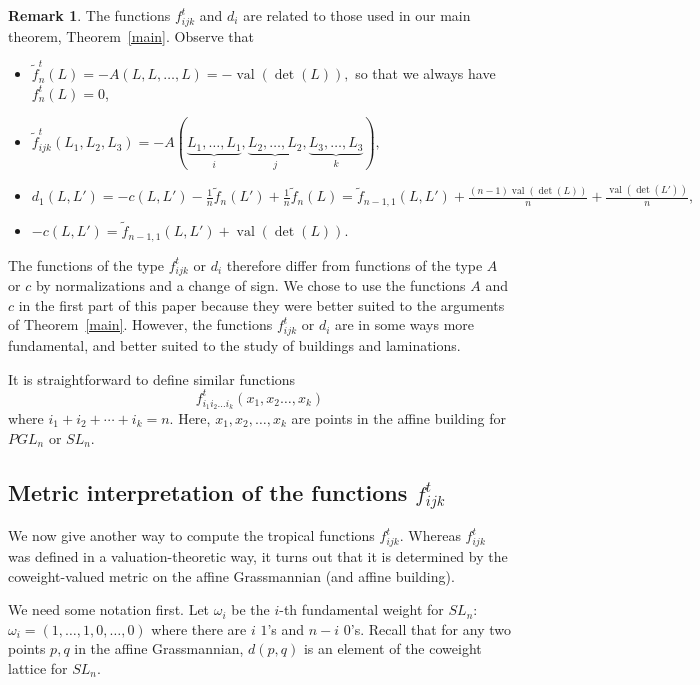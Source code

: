 \documentclass[10pt]{amsart}
\theoremstyle{definition}
\newtheorem{rema}[theorem]{Remark}
\newcommand{\val}{\operatorname{val}}
\begin{document}
\begin{rema} \label{normalization} The functions $f_{ijk}^t$ and $d_i$ are related to those used in our main theorem, Theorem~\ref{main}. Observe that

\begin{itemize}
\item $\tilde{f}^t_n(L)= -A(L, L, \dots, L) = -\val(\det(L)),$ so that we always have $f^t_n(L)=0$,
\item $\tilde{f}_{ijk}^t (L_1,L_2,L_3) = -A(\underbrace{L_1,\ldots,L_1}_{i}, \underbrace{L_2,\ldots,L_2}_{j}, \underbrace{L_3,\ldots,L_3}_{k}),$
\item $d_1(L, L') = -c(L, L') - \frac{1}{n} \tilde{f}_n(L') + \frac{1}{n} \tilde{f}_n(L) = \tilde{f}_{n-1,1}(L,L') + \frac{(n-1)\val(\det(L))}{n} + \frac{\val(\det(L'))}{n},$ 
\item $-c(L, L') = \tilde{f}_{n-1,1}(L,L') + \val(\det(L)).$
\end{itemize}

The functions of the type $f_{ijk}^t$ or $d_i$ therefore differ from functions of the type $A$ or $c$ by normalizations and a change of sign. We chose to use the functions $A$ and $c$ in the first part of this paper because they were better suited to the arguments of Theorem~\ref{main}. However, the functions $f_{ijk}^t$ or $d_i$ are in some ways more fundamental, and better suited to the study of buildings and laminations.

\end{rema}

It is straightforward to define similar functions 
\[
f_{i_1i_2\dots i_k}^t(x_1,x_2\dots,x_k) %
\]
where $i_1+i_2+\cdots+i_k=n$. Here, $x_1, x_2, \dots, x_k$ are points in the affine building for $PGL_n$ or $SL_n$.

\subsection{Metric interpretation of the functions \texorpdfstring{$f^t_{ijk}$}{f ijk t}}

We now give another way to compute the tropical functions $f_{ijk}^t$. Whereas $f_{ijk}^t$ was defined in a valuation-theoretic way, it turns out that it is determined by the coweight-valued metric on the affine Grassmannian (and affine building).

We need some notation first. Let $\omega_i$ be the $i$-th fundamental weight for $SL_n$: $\omega_i = (1, \dots, 1, 0, \dots, 0)$ where there are $i$ $1$'s and $n-i$ $0$'s. Recall that for any two points $p, q$ in the affine Grassmannian, $d(p,q)$ is an element of the coweight lattice for $SL_n$.
\end{document}
